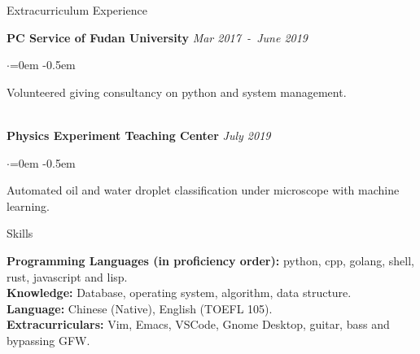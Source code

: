 \documentclass{resume} %
\begin{document}
\begin{rSection}{Extracurriculum Experience}

{\bf PC Service of Fudan University } \hfill {\em Mar 2017\ -\ June 2019}

  \begin{list}{$\cdot$}{\leftmargin=0em} %
   \itemsep -0.5em \vspace{-0.5em} %
\item Volunteered giving consultancy on python and system management.

  \end{list}
  
\\ {\bf Physics Experiment Teaching Center } \hfill {\em July 2019}

  \begin{list}{$\cdot$}{\leftmargin=0em} %
   \itemsep -0.5em \vspace{-0.5em} %
\item Automated oil and water droplet classification under microscope with machine learning.
  \end{list}
  
% 


\end{rSection}




\begin{rSection}{Skills}

{\bf Programming Languages (in proficiency order):} python, cpp, golang, shell, rust, javascript and lisp.
\\ {\bf Knowledge:} Database, operating system, algorithm, data structure.
\\ {\bf Language:} Chinese (Native), English (TOEFL 105).
\\ {\bf Extracurriculars:} Vim, Emacs, VSCode, Gnome Desktop, guitar, bass and bypassing GFW.

\end{rSection}
\end{document}
